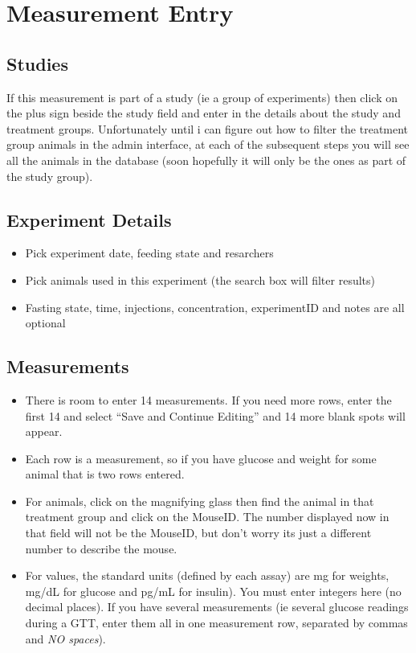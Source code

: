 \documentclass[letterpaper,10pt,english]{sphinxmanual}
\begin{document}
\chapter{Measurement Entry}
\label{usage:measurement-entry}

\section{Studies}
\label{usage:studies}
If this measurement is part of a study (ie a group of experiments) then click on the plus sign beside the study field and enter in the details about the study and treatment groups.  Unfortunately until i can figure out how to filter the treatment group animals in the admin interface, at each of the subsequent steps you will see all the animals in the database (soon hopefully it will only be the ones as part of the study group).


\section{Experiment Details}
\label{usage:experiment-details}\begin{itemize}
\item {} 
Pick experiment date, feeding state and resarchers

\item {} 
Pick animals used in this experiment (the search box will filter results)

\item {} 
Fasting state, time, injections, concentration, experimentID and notes are all optional

\end{itemize}


\section{Measurements}
\label{usage:measurements}\begin{itemize}
\item {} 
There is room to enter 14 measurements.  If you need more rows, enter the first 14 and select ``Save and Continue Editing'' and 14 more blank spots will appear.

\item {} 
Each row is a measurement, so if you have glucose and weight for some animal that is two rows entered.

\item {} 
For animals, click on the magnifying glass then find the animal in that treatment group and click on the MouseID. The number displayed now in that field will not be the MouseID, but don't worry its just a different number to describe the mouse.

\item {} 
For values, the standard units (defined by each assay) are mg for weights, mg/dL for glucose and pg/mL for insulin).  You must enter integers here (no decimal places).  If you have several measurements (ie several glucose readings during a GTT, enter them all in one measurement row, separated by commas and \emph{NO spaces}).

\end{itemize}
\end{document}
